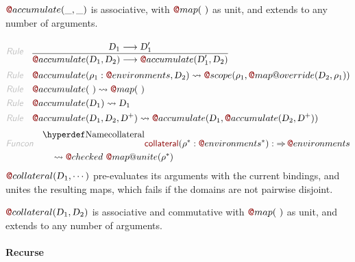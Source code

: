 $\FUN@accumulate
    (  \_, 
           \_ )$ is associative, with $\FUN@map
    (   \  )$ as unit, and extends to any
  number of arguments.

\begin{align*}
  \KEY{Rule} \quad
    & \RULE{
       \VAR{D}\SUB{1} \TRANS 
        \VAR{D}\SUB{1}'
      }{
       \FUN@accumulate
                    (  \VAR{D}\SUB{1}, 
                           \VAR{D}\SUB{2} ) \TRANS 
        \FUN@accumulate
          (  \VAR{D}\SUB{1}', 
                 \VAR{D}\SUB{2} )
      }
\\
  \KEY{Rule} \quad
    & \FUN@accumulate
        (  \VAR{\ensuremath{\rho}}\SUB{1} : \FUN@environments, 
               \VAR{D}\SUB{2} ) \leadsto 
        \FUN@scope
          (  \VAR{\ensuremath{\rho}}\SUB{1}, 
                 \FUN@map@override
                  (  \VAR{D}\SUB{2}, 
                         \VAR{\ensuremath{\rho}}\SUB{1} ) )
\\
  \KEY{Rule} \quad
    & \FUN@accumulate
        (   \  ) \leadsto 
        \FUN@map
          (   \  )
\\
  \KEY{Rule} \quad
    & \FUN@accumulate
        (  \VAR{D}\SUB{1} ) \leadsto 
        \VAR{D}\SUB{1}
\\
  \KEY{Rule} \quad
    & \FUN@accumulate
        (  \VAR{D}\SUB{1}, 
               \VAR{D}\SUB{2}, 
               \VAR{D}\PLUS ) \leadsto 
        \FUN@accumulate
          (  \VAR{D}\SUB{1}, 
                 \FUN@accumulate
                  (  \VAR{D}\SUB{2}, 
                         \VAR{D}\PLUS ) )
\end{align*}
\begin{align*}
  \KEY{Funcon} \quad
  & \FUNDEC{collateral}(
                     \VAR{\ensuremath{\rho}}\STAR : \FUN@environments\STAR) 
    :  \TO \FUN@environments \\&\quad
    \leadsto \FUN@checked \ 
               \FUN@map@unite
                 (  \VAR{\ensuremath{\rho}}\STAR )
\end{align*}
$\FUN@collateral
    (  \VAR{D}\SUB{1}, 
           \cdots )$ pre-evaluates its arguments with the current bindings,
  and unites the resulting maps, which fails if the domains are not pairwise
  disjoint.

$\FUN@collateral
    (  \VAR{D}\SUB{1}, 
           \VAR{D}\SUB{2} )$ is associative and commutative with $\FUN@map
    (   \  )$ as unit, 
  and extends to any number of arguments.

\paragraph{Recurse}\hypertarget{recurse}{}\label{recurse}


